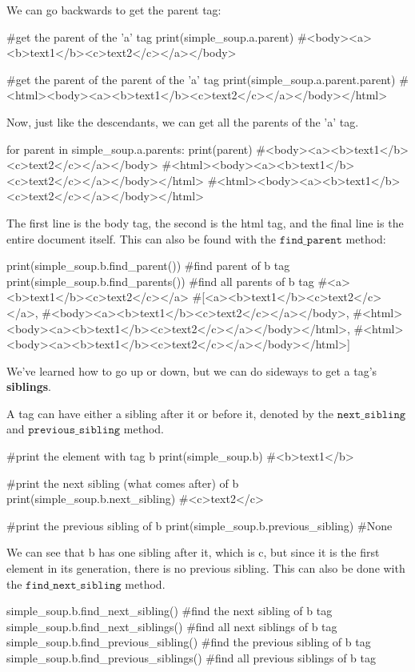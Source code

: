 \documentclass{article}
\begin{document}
  \begin{definition}[Parents]
  We can go backwards to get the parent tag: 
  \begin{python}
  #get the parent of the 'a' tag 
  print(simple_soup.a.parent)
  #<body><a><b>text1</b><c>text2</c></a></body>

  #get the parent of the parent of the 'a' tag
  print(simple_soup.a.parent.parent)
  #<html><body><a><b>text1</b><c>text2</c></a></body></html>
  \end{python}
  Now, just like the descendants, we can get all the parents of the 'a' tag. 
  \begin{python}
  for parent in simple_soup.a.parents: 
      print(parent) 
  #<body><a><b>text1</b><c>text2</c></a></body>
  #<html><body><a><b>text1</b><c>text2</c></a></body></html>
  #<html><body><a><b>text1</b><c>text2</c></a></body></html>
  \end{python}
  The first line is the body tag, the second is the html tag, and the final line is the entire document itself. This can also be found with the $\texttt{find\_parent}$ method: 
  \begin{python}
  print(simple_soup.b.find_parent())   #find parent of b tag
  print(simple_soup.b.find_parents())  #find all parents of b tag
  #<a><b>text1</b><c>text2</c></a>
  #[<a><b>text1</b><c>text2</c></a>,
  #<body><a><b>text1</b><c>text2</c></a></body>,
  #<html><body><a><b>text1</b><c>text2</c></a></body></html>,
  #<html><body><a><b>text1</b><c>text2</c></a></body></html>]
  \end{python}
  \end{definition}

  We've learned how to go up or down, but we can do sideways to get a tag's \textbf{siblings}. 

  \begin{definition}
  A tag can have either a sibling after it or before it, denoted by the $\texttt{next\_sibling}$ and $\texttt{previous\_sibling}$ method. 
  \begin{python}
  #print the element with tag b
  print(simple_soup.b)
  #<b>text1</b>

  #print the next sibling (what comes after) of b
  print(simple_soup.b.next_sibling)
  #<c>text2</c>

  #print the previous sibling of b
  print(simple_soup.b.previous_sibling) 
  #None
  \end{python}
  We can see that b has one sibling after it, which is c, but since it is the first element in its generation, there is no previous sibling. This can also be done with the $\texttt{find\_next\_sibling}$ method. 
  \begin{python}
  simple_soup.b.find_next_sibling()      #find the next sibling of b tag
  simple_soup.b.find_next_siblings()     #find all next siblings of b tag 
  simple_soup.b.find_previous_sibling()  #find the previous sibling of b tag
  simple_soup.b.find_previous_siblings() #find all previous siblings of b tag 
  \end{python}
  \end{definition}
\end{document}
